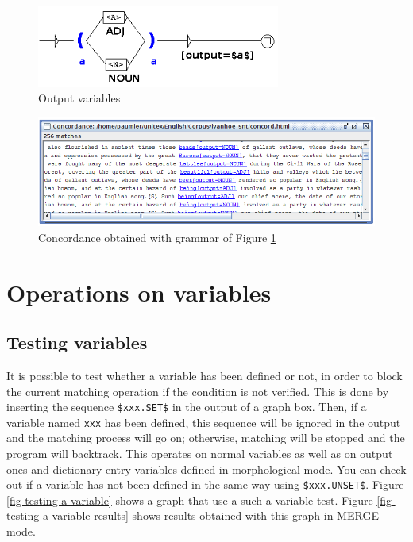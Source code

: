 \begin{figure}[!ht]
\begin{center}
\includegraphics[width=8cm]{resources/img/fig6-17r.png}
\caption{Output variables\label{fig-output-variables}}
\end{center}
\end{figure}

\begin{figure}[!ht]
\begin{center}
\includegraphics[width=15cm]{resources/img/fig6-17s.png}
\caption{Concordance obtained with grammar of Figure \ref{fig-output-variables}\label{fig-output-variables-concord}}
\end{center}
\end{figure}


\section{Operations on variables}
\subsection{Testing variables}

\noindent It is possible to test whether a variable has been defined or not, in
order to block the current matching operation if the condition is not verified.
This is done by inserting the sequence \verb+$xxx.SET$+ in the output of a
graph box. Then, if a variable named \verb+xxx+ has been defined, this sequence
will be ignored in the output and the matching process will go on; otherwise, matching
will be stopped and the program will backtrack. This operates on
normal variables as well as on output ones and dictionary entry variables defined in
morphological mode. You can check out if a variable has not been defined in the
same way using \verb+$xxx.UNSET$+. Figure \ref{fig-testing-a-variable} shows
a graph that use a such a variable test. Figure
\ref{fig-testing-a-variable-results} shows results obtained with this graph in
MERGE mode.

